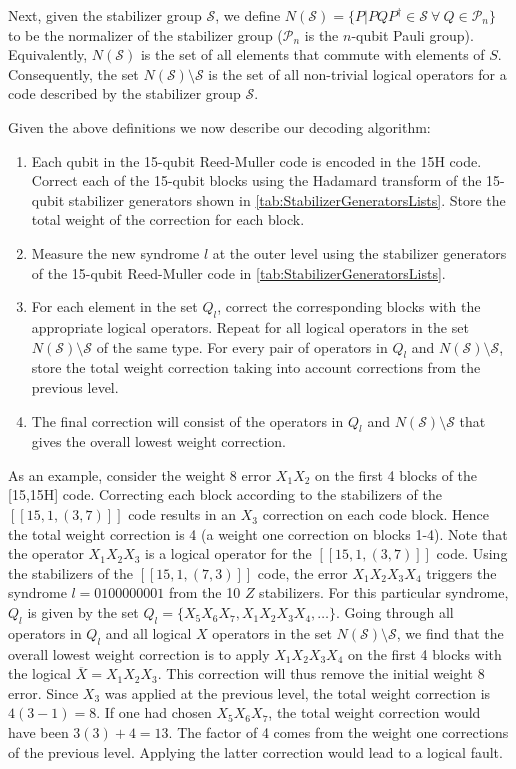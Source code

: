 \documentclass[pra,longbibliography,twocolumn,showpacs,nofootinbib,superscriptaddress,notitlepage]{revtex4-1}
\newcommand{\codepar}[1]{\ensuremath{[\![#1]\!]}}
\begin{document}
Next, given the stabilizer group $\mathcal{S}$, we define $N(\mathcal{S}) = {\{ P| PQP^{\dagger}}\in \mathcal{S} \> \forall  \> Q \in \mathcal{P}_{n} \}$ to be the normalizer of the stabilizer group ($\mathcal{P}_{n}$ is the $n$-qubit Pauli group). Equivalently, $N(\mathcal{S})$ is the set of all elements that commute with elements of $S$. Consequently, the set $N(\mathcal{S}) \setminus \mathcal{S}$ is the set of all non-trivial logical operators for a code described by the stabilizer group $\mathcal{S}$. 

Given the above definitions we now describe our decoding algorithm:

\begin{enumerate}
   \item Each qubit in the 15-qubit Reed-Muller code is encoded in the 15H code. Correct each of the 15-qubit blocks using the Hadamard transform of the 15-qubit stabilizer generators shown in \cref{tab:StabilizerGeneratorsLists}. Store the total weight of the correction for each block.
   \item  Measure the new syndrome $l$ at the outer level using the stabilizer generators of the 15-qubit Reed-Muller code in \cref{tab:StabilizerGeneratorsLists}. 
   \item For each element in the set $Q_{l}$, correct the corresponding blocks with the appropriate logical operators. Repeat for all logical operators in the set $N(\mathcal{S}) \setminus \mathcal{S}$ of the same type. For every pair of operators in $Q_{l}$ and $N(\mathcal{S}) \setminus \mathcal{S}$, store the total weight correction taking into account corrections from the previous level. 
   \item The final correction will consist of the operators in $Q_{l}$ and $N(\mathcal{S}) \setminus \mathcal{S}$ that gives the overall lowest weight correction. 
\end{enumerate}

As an example, consider the weight 8 error $X_{1}X_{2}$ on the first 4 blocks of the [15,15H] code. Correcting each block according to the stabilizers of the $\codepar{15,1,(3,7)}$ code results in an $X_{3}$ correction on each code block. Hence the total weight correction is 4 (a weight one correction on blocks 1-4). Note that the operator $X_{1}X_{2}X_{3}$ is a logical operator for the $\codepar{15,1,(3,7)}$ code. Using the stabilizers of the $\codepar{15,1,(7,3)}$ code, the error $X_{1}X_{2}X_{3}X_{4}$ triggers the syndrome $l=0100000001$ from the 10 $Z$ stabilizers. For this particular syndrome, $Q_{l}$ is given by the set $Q_{l} = \{ X_{5}X_{6}X_{7}, X_{1}X_{2}X_{3}X_{4}, \dots \}$. Going through all operators in $Q_{l}$ and all logical $X$ operators in the set $N(\mathcal{S}) \setminus \mathcal{S}$, we find that the overall lowest weight correction is to apply $X_{1}X_{2}X_{3}X_{4}$ on the first 4 blocks with the logical $\overline{X}=X_{1}X_{2}X_{3}$. This correction will thus remove the initial weight 8 error. Since $X_{3}$ was applied at the previous level, the total weight correction is $4(3-1) = 8$. If one had chosen $X_{5}X_{6}X_{7}$, the total weight correction would have been $3(3) + 4 = 13$. The factor of 4 comes from the weight one corrections of the previous level. Applying the latter correction would lead to a logical fault.
\end{document}
